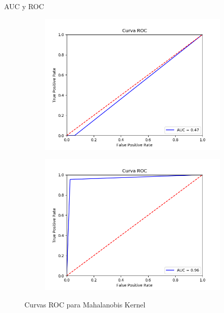 \documentclass[10pt]{beamer}
\begin{document}
\begin{frame}[fragile]{AUC y ROC}
\vspace{10px}

\begin{figure}[H]
	\centering
	\begin{subfigure}{.49\textwidth}
		\centering
		\includegraphics[scale=0.35]{Imagenes/roc/Mahalanobis_Kernel_wbc}
	\end{subfigure}
	\begin{subfigure}{.49\textwidth}
		\centering
		\includegraphics[scale=0.35]{Imagenes/roc/Mahalanobis_Kernel_breastw}
	\end{subfigure}
	\caption*{Curvas ROC para Mahalanobis Kernel}
	\label{ROC_MK}
\end{figure}

\end{frame}
\end{document}
